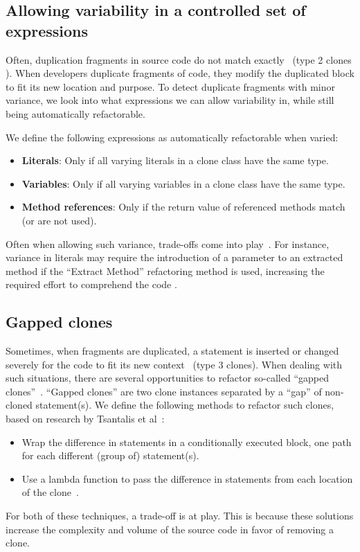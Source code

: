 \documentclass[sigconf,review,anonymous]{acmart}
\begin{document}
\subsection{Allowing variability in a controlled set of expressions} \label{sec:t2r}
Often, duplication fragments in source code do not match exactly~\cite{kodhai2013method} (type 2 clones \cite{roy2007survey}). When developers duplicate fragments of code, they modify the duplicated block to fit its new location and purpose. To detect duplicate fragments with minor variance, we look into what expressions we can allow variability in, while still being automatically refactorable.

We define the following expressions as automatically refactorable when varied:
\begin{itemize}
  \item \textbf{Literals}: Only if all varying literals in a clone class have the same type.
  \item \textbf{Variables}: Only if all varying variables in a clone class have the same type.
  \item \textbf{Method references}: Only if the return value of referenced methods match (or are not used).
\end{itemize}

Often when allowing such variance, trade-offs come into play~\cite{krishnan2013refactoring, krishnan2014unification}. For instance, variance in literals may require the introduction of a parameter to an extracted method if the ``Extract Method'' refactoring method is used, increasing the required effort to comprehend the code \cite{heitlager2007practical}.

\subsection{Gapped clones} \label{sec:t3r}
Sometimes, when fragments are duplicated, a statement is inserted or changed severely for the code to fit its new context~\cite{roy2007survey} (type 3 clones). When dealing with such situations, there are several opportunities to refactor so-called ``gapped clones''~\cite{ueda2002detection, zhao2018automatic}. ``Gapped clones'' are two clone instances separated by a ``gap'' of non-cloned statement(s). We define the following methods to refactor such clones, based on research by Tsantalis et al~\cite{tsantalis2015assessing}:
\begin{itemize}
  \item Wrap the difference in statements in a conditionally executed block, one path for each different (group of) statement(s).
  \item Use a lambda function to pass the difference in statements from each location of the clone~\cite{tsantalis2017clone}.
\end{itemize}
For both of these techniques, a trade-off is at play. This is because these solutions increase the complexity and volume of the source code in favor of removing a clone.
\end{document}
